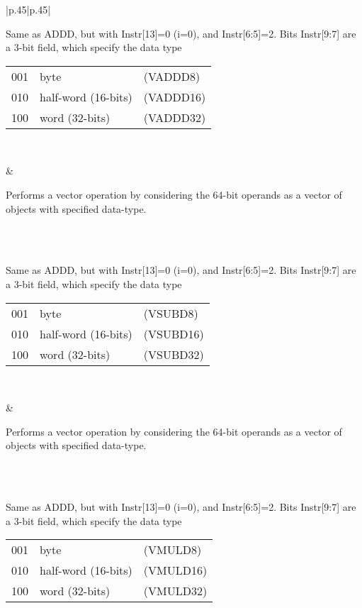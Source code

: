 \documentclass{book}
\begin{document}
\begin{table}[p]
  \centering
  \begin{tabular}[p]{|p{.45\textwidth}|p{.45\textwidth}|}
    \hline
{} \\ 
 \hline 
 \parbox{\linewidth}{        Same as ADDD, but with Instr[13]=0 (i=0),
    and Instr[6:5]=2. Bits Instr[9:7] are a 3-bit field, which specify
    the data type \\
\begin{tabular}[p]{|l|l|l|}
\hline
  001  &   byte			 & (VADDD8)\\
  010  &   half-word (16-bits)	 & (VADDD16)\\
  100  &   word (32-bits) 		 & (VADDD32)\\
\hline
\end{tabular}\\
} & 
 \parbox{\linewidth}{        Performs a vector operation by considering the 64-bit operands as a vector of objects with specified data-type.}\\
\hline
\hline
{} \\ 
 \hline 
 \parbox{\linewidth}{        Same as ADDD, but with Instr[13]=0 (i=0),
    and Instr[6:5]=2.  Bits Instr[9:7] are a 3-bit field, which
    specify the data type\\
\begin{tabular}[p]{|l|l|l|}
\hline
  001  &   byte 			 & (VSUBD8)\\
  010  &   half-word (16-bits)	 & (VSUBD16)\\
  100  &   word (32-bits) 		 & (VSUBD32)\\
\hline
\end{tabular}\\
} & 
 \parbox{\linewidth}{        Performs a vector operation by considering the 64-bit operands as a vector of objects with specified data-type.}\\
\hline
\hline
{} \\ 
 \hline 
 \parbox{\linewidth}{        Same as ADDD, but with Instr[13]=0 (i=0),
    and Instr[6:5]=2. Bits Instr[9:7] are a 3-bit field, which specify
    the data type\\
\begin{tabular}[p]{|l|l|l|}
\hline
  001  &   byte			 & (VMULD8)\\
  010  &   half-word (16-bits)	 & (VMULD16)\\
  100  &   word (32-bits) 		 & (VMULD32)\\

\end{tabular}}
\end{tabular}
\end{table}
\end{document}
